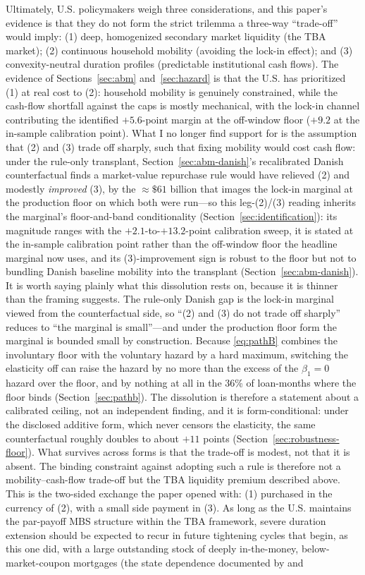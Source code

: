 \documentclass[12pt]{article}
\begin{document}
Ultimately, U.S. policymakers weigh three considerations, and this paper's evidence is that they do not form the strict trilemma a three-way ``trade-off'' would imply: (1) deep, homogenized secondary market liquidity (the TBA market); (2) continuous household mobility (avoiding the lock-in effect); and (3) convexity-neutral duration profiles (predictable institutional cash flows). The evidence of Sections~\ref{sec:abm} and~\ref{sec:hazard} is that the U.S. has prioritized (1) at real cost to (2): household mobility is genuinely constrained, while the cash-flow shortfall against the caps is mostly mechanical, with the lock-in channel contributing the identified $+5.6$-point margin at the off-window floor ($+9.2$ at the in-sample calibration point). What I no longer find support for is the assumption that (2) and (3) trade off sharply, such that fixing mobility would cost cash flow: under the rule-only transplant, Section~\ref{sec:abm-danish}'s recalibrated Danish counterfactual finds a market-value repurchase rule would have relieved (2) and modestly \emph{improved} (3), by the $\approx\$61$ billion that images the lock-in marginal at the production floor on which both were run---so this leg-(2)/(3) reading inherits the marginal's floor-and-band conditionality (Section~\ref{sec:identification}): its magnitude ranges with the $+2.1$-to-$+13.2$-point calibration sweep, it is stated at the in-sample calibration point rather than the off-window floor the headline marginal now uses, and its (3)-improvement sign is robust to the floor but not to bundling Danish baseline mobility into the transplant (Section~\ref{sec:abm-danish}). It is worth saying plainly what this dissolution rests on, because it is thinner than the framing suggests. The rule-only Danish gap is the lock-in marginal viewed from the counterfactual side, so ``(2) and (3) do not trade off sharply'' reduces to ``the marginal is small''---and under the production floor form the marginal is bounded small by construction. Because \eqref{eq:pathB} combines the involuntary floor with the voluntary hazard by a hard maximum, switching the elasticity off can raise the hazard by no more than the excess of the $\beta_1 = 0$ hazard over the floor, and by nothing at all in the 36\% of loan-months where the floor binds (Section~\ref{sec:pathb}). The dissolution is therefore a statement about a calibrated ceiling, not an independent finding, and it is form-conditional: under the disclosed additive form, which never censors the elasticity, the same counterfactual roughly doubles to about $+11$ points (Section~\ref{sec:robustness-floor}). What survives across forms is that the trade-off is modest, not that it is absent. The binding constraint against adopting such a rule is therefore not a mobility--cash-flow trade-off but the TBA liquidity premium described above. This is the two-sided exchange the paper opened with: (1) purchased in the currency of (2), with a small side payment in (3). As long as the U.S. maintains the par-payoff MBS structure within the TBA framework, severe duration extension should be expected to recur in future tightening cycles that begin, as this one did, with a large outstanding stock of deeply in-the-money, below-market-coupon mortgages (the state dependence documented by \citet{berger2021} and 
\end{document}
